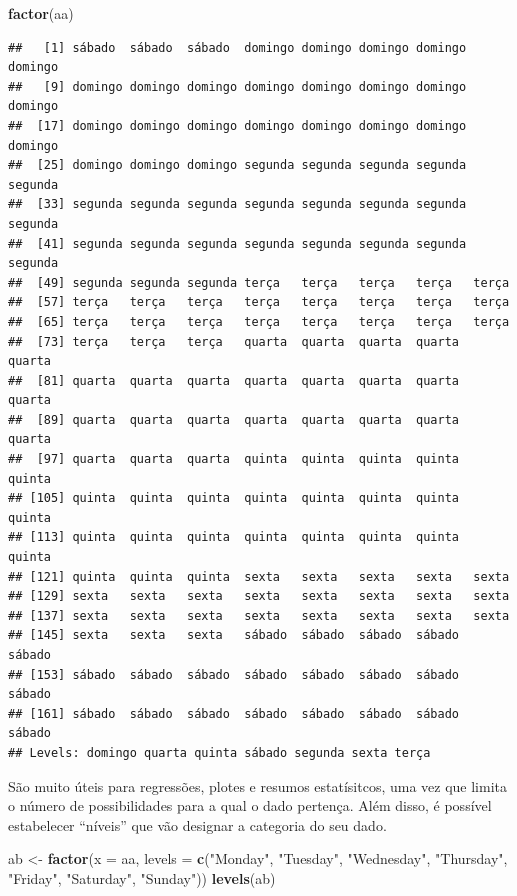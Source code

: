 \documentclass[]{book}
\newenvironment{Shaded}{\begin{snugshade}}{\end{snugshade}}
\newcommand{\KeywordTok}[1]{\textcolor[rgb]{0.13,0.29,0.53}{\textbf{#1}}}
\newcommand{\DataTypeTok}[1]{\textcolor[rgb]{0.13,0.29,0.53}{#1}}
\newcommand{\StringTok}[1]{\textcolor[rgb]{0.31,0.60,0.02}{#1}}
\newcommand{\NormalTok}[1]{#1}
\theoremstyle{definition}
\theoremstyle{definition}
\theoremstyle{definition}
\theoremstyle{remark}
\begin{document}
\begin{Shaded}
\begin{Highlighting}[]
\KeywordTok{factor}\NormalTok{(aa)}
\end{Highlighting}
\end{Shaded}

\begin{verbatim}
##   [1] sábado  sábado  sábado  domingo domingo domingo domingo domingo
##   [9] domingo domingo domingo domingo domingo domingo domingo domingo
##  [17] domingo domingo domingo domingo domingo domingo domingo domingo
##  [25] domingo domingo domingo segunda segunda segunda segunda segunda
##  [33] segunda segunda segunda segunda segunda segunda segunda segunda
##  [41] segunda segunda segunda segunda segunda segunda segunda segunda
##  [49] segunda segunda segunda terça   terça   terça   terça   terça  
##  [57] terça   terça   terça   terça   terça   terça   terça   terça  
##  [65] terça   terça   terça   terça   terça   terça   terça   terça  
##  [73] terça   terça   terça   quarta  quarta  quarta  quarta  quarta 
##  [81] quarta  quarta  quarta  quarta  quarta  quarta  quarta  quarta 
##  [89] quarta  quarta  quarta  quarta  quarta  quarta  quarta  quarta 
##  [97] quarta  quarta  quarta  quinta  quinta  quinta  quinta  quinta 
## [105] quinta  quinta  quinta  quinta  quinta  quinta  quinta  quinta 
## [113] quinta  quinta  quinta  quinta  quinta  quinta  quinta  quinta 
## [121] quinta  quinta  quinta  sexta   sexta   sexta   sexta   sexta  
## [129] sexta   sexta   sexta   sexta   sexta   sexta   sexta   sexta  
## [137] sexta   sexta   sexta   sexta   sexta   sexta   sexta   sexta  
## [145] sexta   sexta   sexta   sábado  sábado  sábado  sábado  sábado 
## [153] sábado  sábado  sábado  sábado  sábado  sábado  sábado  sábado 
## [161] sábado  sábado  sábado  sábado  sábado  sábado  sábado  sábado 
## Levels: domingo quarta quinta sábado segunda sexta terça
\end{verbatim}

São muito úteis para regressões, plotes e resumos estatísitcos, uma vez
que limita o número de possibilidades para a qual o dado pertença. Além
disso, é possível estabelecer ``níveis'' que vão designar a categoria do
seu dado.

\begin{Shaded}
\begin{Highlighting}[]
\NormalTok{ab <-}\StringTok{ }\KeywordTok{factor}\NormalTok{(}\DataTypeTok{x =}\NormalTok{ aa,}
             \DataTypeTok{levels =} \KeywordTok{c}\NormalTok{(}\StringTok{"Monday"}\NormalTok{, }\StringTok{"Tuesday"}\NormalTok{,  }\StringTok{"Wednesday"}\NormalTok{,  }\StringTok{"Thursday"}\NormalTok{,}
                        \StringTok{"Friday"}\NormalTok{, }\StringTok{"Saturday"}\NormalTok{, }\StringTok{"Sunday"}\NormalTok{))}
\KeywordTok{levels}\NormalTok{(ab)}
\end{Highlighting}
\end{Shaded}
\end{document}

